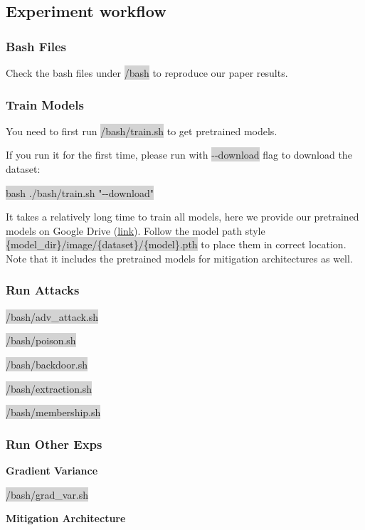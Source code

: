 \documentclass[letterpaper,twocolumn,10pt]{article}
\begin{document}
{{{{%
\subsection{Experiment workflow}
\subsubsection*{Bash Files}
Check the bash files under \colorbox{lightgray}{/bash} to reproduce our paper results.
\subsubsection*{Train Models}
You need to first run \colorbox{lightgray}{/bash/train.sh} to get pretrained models.

If you run it for the first time, please run with \colorbox{lightgray}{-{}-download} flag to download the dataset:

\colorbox{lightgray}{bash ./bash/train.sh "-{}-download"}

It takes a relatively long time to train all models, here we provide our pretrained models on Google Drive (\href{https://drive.google.com/drive/folders/1GrjEO89hYrdLhDMkBLC26jp1C7BwIKwm?usp=sharing}{link}). Follow the model path style \colorbox{lightgray}{\{model\_dir\}/image/\{dataset\}/\{model\}.pth} to place them in correct location. Note that it includes the pretrained models for mitigation architectures as well.

\subsubsection*{Run Attacks}
\noindent
\colorbox{lightgray}{/bash/adv\_attack.sh}

\noindent
\colorbox{lightgray}{/bash/poison.sh}

\noindent
\colorbox{lightgray}{/bash/backdoor.sh}

\noindent
\colorbox{lightgray}{/bash/extraction.sh}

\noindent
\colorbox{lightgray}{/bash/membership.sh}

\subsubsection*{Run Other Exps}
\noindent
\textbf{Gradient Variance}

\noindent
\colorbox{lightgray}{/bash/grad\_var.sh}

\noindent
\textbf{Mitigation Architecture}

}}}}
\end{document}
